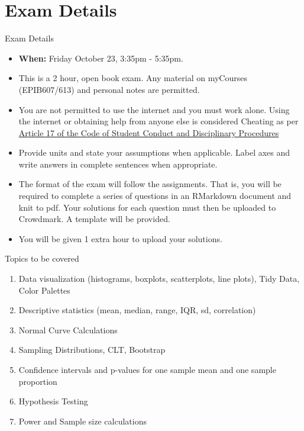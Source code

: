 \documentclass[10pt]{beamer}\usepackage[]{graphicx}\usepackage[]{color}
\begin{document}
\section{Exam Details}
\begin{frame}{Exam Details}
	
	\begin{itemize}
		\setlength\itemsep{.51em}
		\item \textbf{When:} Friday October 23, 3:35pm - 5:35pm.
		\item This is a 2 hour, open book exam. Any material on myCourses (EPIB607/613) and personal notes are permitted.
		\item You are not permitted to use the internet and you must work alone. Using the internet or obtaining help from anyone else is considered Cheating as per \href{https://www.mcgill.ca/students/srr/academicrights/integrity/cheating}{Article 17 of the Code of Student Conduct and Disciplinary Procedures}
		\item Provide units and state your assumptions when applicable. Label axes and write answers in complete sentences when appropriate.
		\item The format of the exam will follow the assignments. That is, you will be required to complete a series of questions in an RMarkdown document and knit to pdf. Your solutions for each question must then be uploaded to Crowdmark. A template will be provided.
		\item You will be given 1 extra hour to upload your solutions.
		
	\end{itemize}
	
\end{frame}

\begin{frame}{Topics to be covered}
	
	\begin{enumerate}
		\setlength\itemsep{.51em}
		\item Data visualization (histograms, boxplots, scatterplots, line plots), Tidy Data, Color Palettes
		\item Descriptive statistics (mean, median, range, IQR, sd, correlation)
		\item Normal Curve Calculations
		\item Sampling Distributions, CLT, Bootstrap
		\item Confidence intervals and p-values for one sample mean and one sample proportion
		\item Hypothesis Testing
		\item Power and Sample size calculations
	\end{enumerate}
	
\end{frame}
\end{document}
